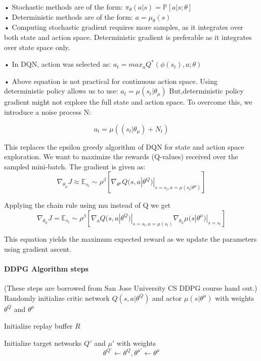 \documentclass[11pt]{amsart}
\begin{document}
• Stochastic methods are of the form:    $\pi_\theta(a|s) = \mathbb{P}[a|s;\theta]$\\

• Deterministic methods are of the form: $a = \mu_\theta(s)$\\

• Computing stochastic gradient requires more samples, as it
integrates over both state and action space. Deterministic gradient
is preferable as it integrates over state space only.

• In DQN, action was selected as: $a_{t} = max_{a} Q^*(\phi(s_{t}),a;\theta)$

• Above equation is not practical for continuous action space. Using deterministic policy allows us to use:   $a_{t} = \mu(s_{t}|\theta_{\mu})$
But,deterministic policy gradient might not explore the full state and action space. To overcome this, we introduce a noise process N:\

$$a_{t} = \mu((s_{t}|\theta_{\mu})+N_{t}) $$



This replaces the epsilon greedy algorithm of DQN for state and action space exploration.
We want to maximize the rewards (Q-values) received over the sampled mini-batch. The gradient is given as:
$$\nabla_{\theta_{\mu}} J \approx \mathbb{E}_{s_{t}} \sim \rho^\beta [\nabla_{\theta^\mu} Q(s,a|\theta^Q)|_{s=s_{t},a=\mu(s_{t}|\theta^\mu)}]$$

Applying the chain rule using mu instead of Q we get
$$\nabla_{\theta_{\mu}} J = \mathbb{E}_{s_{t}} \sim \rho^\beta [\nabla_{a} Q(s,a|\theta^Q)|_{s=s_{t},a=\mu(s_{t})}\nabla_{\theta_{\mu}}\mu(s|\theta^\mu)|_{s=s_{t}}]$$


This equation yields the maximum expected reward as we update the parameters using gradient ascent.\\

\paragraph{\textbf{DDPG Algorithm steps}}
\par
(These steps are borrowed from San Jose University CS DDPG course hand out.)\\

Randomly  initialize critic network $Q(s,a|\theta^Q)$  and  actor $\mu(s|\theta^\mu)$  with weights $ \theta^Q$   and  $\theta^\mu$

Initialize replay buffer $R$

Initialize target networks $ Q'$ and $\mu'$ with weights $$\theta^{Q'} \leftarrow \theta^{Q} , \theta^{\mu'} \leftarrow \theta^{\mu}$$ 
\end{document}

